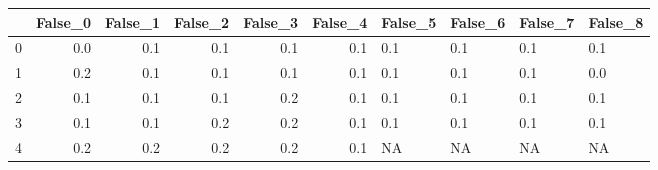 \begin{tabular}{lrrrrrllll}
\toprule
{} &  False\_0 &  False\_1 &  False\_2 &  False\_3 &  False\_4 & False\_5 & False\_6 & False\_7 & False\_8 \\ \hline
\midrule
0 &      0.0 &      0.1 &      0.1 &      0.1 &      0.1 &     0.1 &     0.1 &     0.1 &     0.1 \\ \hline
1 &      0.2 &      0.1 &      0.1 &      0.1 &      0.1 &     0.1 &     0.1 &     0.1 &     0.0 \\ \hline
2 &      0.1 &      0.1 &      0.1 &      0.2 &      0.1 &     0.1 &     0.1 &     0.1 &     0.1 \\ \hline
3 &      0.1 &      0.1 &      0.2 &      0.2 &      0.1 &     0.1 &     0.1 &     0.1 &     0.1 \\ \hline
4 &      0.2 &      0.2 &      0.2 &      0.2 &      0.1 &      NA &      NA &      NA &      NA \\ \hline
\bottomrule
\end{tabular}

